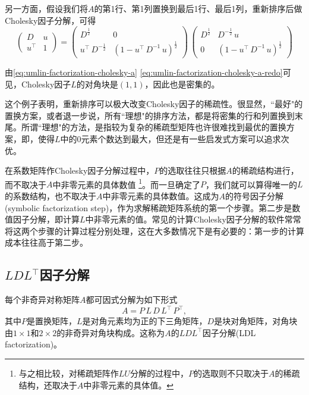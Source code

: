 \begin{subappendices}
另一方面，假设我们将$A$的第1行、第1列置换到最后1行、最后1列，重新排序后做Cholesky因子分解，可得
\begin{equation}
  \label{eq:umlin-factorization-cholesky-a-redo}
\begin{pmatrix}
  D & u \\
  u^{\top} & 1
\end{pmatrix}
= \begin{pmatrix}
D^{\frac{1}{2}} & 0 \\
u^{\top} \, D^{-\frac{1}{2}} & \left( 1 - u^{\top} \, D^{-1} \, u \right)^{\frac{1}{2}}
\end{pmatrix}
\,
\begin{pmatrix}
  D^{\frac{1}{2}} & D^{-\frac{1}{2}} \, u \\
  0 & \left( 1 - u^{\top} \, D^{-1} \, u \right)^{\frac{1}{2}}
\end{pmatrix}
\end{equation}

由\eqref{eq:umlin-factorization-cholesky-a} \eqref{eq:umlin-factorization-cholesky-a-redo}可见，Cholesky因子$L$的对角块是$(1,1)$，因此也是密集的。

这个例子表明，重新排序可以极大改变Cholesky因子的稀疏性。很显然，``最好"的置换方案，或者退一步说，所有``理想"的排序方法，都是将密集的行和列置换到末尾。所谓``理想"的方法，是指较为复杂的稀疏型矩阵也许很难找到最优的置换方案，即，使得$L$中的$0$元素个数达到最大，但还是有一些启发式方案可以追求次优。

在系数矩阵作Cholesky因子分解过程中，$P$的选取往往只根据$A$的稀疏结构进行，而不取决于$A$中非零元素的具体数值%
\footnote{与之相比较，对稀疏矩阵作$LU$分解的过程中，$P$的选取则不只取决于$A$的稀疏结构，还取决于$A$中非零元素的具体值。}。而一旦确定了$P$，我们就可以算得唯一的$L$的系数结构，也不取决于$A$中非零元素的具体数值。这成为$A$的符号因子分解(symbolic factorization step)，作为求解稀疏矩阵系统的第一个步骤。第二步是数值因子分解，即计算$L$中非零元素的值。常见的计算Cholesky因子分解的软件常常将这两个步骤的计算过程分别处理，这在大多数情况下是有必要的：第一步的计算成本往往高于第二步。

\subsection[LDL因子分解]{$LDL^{\top}$因子分解}
\label{sec:numlin-factorization-ldl}
每个非奇异对称矩阵$A$都可因式分解为如下形式
\begin{equation}
  \label{eq:numlin-factorization-ldl}
  A = P \, L \, D \, L^{\top} \, P^{\top},
\end{equation}
其中$P$是置换矩阵，$L$是对角元素均为正的下三角矩阵，$D$是块对角矩阵，对角块由$1 \times 1$和$2 \times 2$的非奇异对角块构成。这称为$A$的$LDL^{\top}$因子分解(LDL factorization)。


\end{subappendices}
